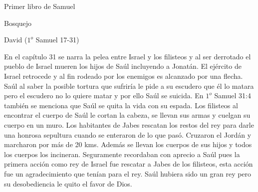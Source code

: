 \begin{section}{Primer libro de Samuel}
\begin{subsection}{Bosquejo}
\begin{subsubsection}{David ($1^{o}$ Samuel 17-31)}
\begin{enumerate}
					En el capítulo 31 se narra la pelea entre Israel y los filisteos y al ser derrotado el pueblo de Israel mueren los hijos de Saúl incluyendo a Jonatán. El ejército de Israel retrocede y al fin rodeado por los enemigos es alcanzado por una flecha. Saúl al saber la posible tortura que sufriría le pide a su escudero que él lo matara pero el escudero no lo quiere matar y por ello Saúl se suicida. En $1^{o}$ Samuel 31:4 también se menciona que Saúl se quita la vida con su espada. Los filisteos al encontrar el cuerpo de Saúl le cortan la cabeza, se llevan sus armas y cuelgan su cuerpo en un muro. Los habitantes de Jabes rescatan los restos del rey para darle una honrosa sepultura cuando se enteraron de lo que pasó. Cruzaron el Jordán y marcharon por más de 20 kms. Además se llevan los cuerpos de sus hijos y todos los cuerpos los incineran. Seguramente recordaban con aprecio a Saúl pues la primera acción como rey de Israel fue rescatar a Jabes de los filisteos, esta acción fue un agradecimiento que tenían para el rey. Saúl hubiera sido un gran rey pero su desobediencia le quito el favor de Dios.
			\end{enumerate}
		\end{subsubsection}
	\end{subsection}

\end{section}
%	


